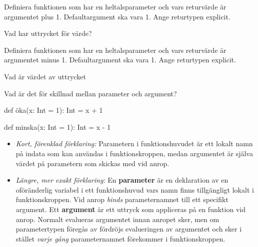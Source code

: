 \Subtask Definiera funktionen  som har en heltalsparameter  och vars returvärde är argumentet plus 1. Defaultargument ska vara 1. Ange returtypen explicit.

\Subtask Vad har uttrycket  för värde?

\Subtask Definiera funktionen  som har en heltalsparameter  och vars returvärde är argumentet minus 1. Defaultargument ska vara 1. Ange returtypen explicit.

\Subtask Vad är värdet av uttrycket 

\Subtask Vad är det för skillnad mellan parameter och argument?

\SOLUTION

\TaskSolved \what

\SubtaskSolved
\begin{Code}
def öka(x: Int = 1): Int = x + 1
\end{Code}

\SubtaskSolved  {}

\SubtaskSolved
\begin{Code}
def minska(x: Int = 1): Int = x - 1
\end{Code}

\SubtaskSolved  {}

\SubtaskSolved
\begin{itemize}
  \item \emph{Kort, förenklad förklaring:} Parametern i funktionshuvudet är ett lokalt namn på indata som kan användas i funktionskroppen, medan argumentet är själva värdet på parametern som skickas med vid anrop.
  \item \emph{Längre, mer exakt förklaring:} En \textbf{parameter} är en deklaration av en oföränderlig variabel i ett funktionshuvud vars namn finns tillgängligt lokalt i funktionskroppen. Vid anrop \emph{binds} parameternamnet till ett specifikt argument. Ett \textbf{argument} är ett uttryck som  appliceras på en funktion vid anrop. Normalt evalueras argumentet innan anropet sker, men om parametertypen föregås av \code{=>} fördröjs evalueringen av argumentet och sker i stället \emph{varje gång} parameternamnet förekommer i funktionskroppen.
\end{itemize}

\QUESTEND





\QUESTBEGIN

